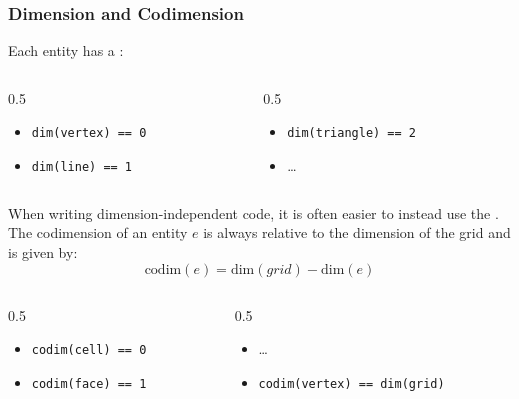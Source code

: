 \documentclass[aspectratio=169,11pt]{beamer}
\theoremstyle{definition}
\begin{document}
\begin{frame}[fragile]
  \frametitle{Dimension and Codimension}
  Each entity has a :
  \begin{columns}
    \begin{column}{0.5\textwidth}
      \begin{itemize}
      \item \lstinline!dim(vertex) == 0!
      \item \lstinline!dim(line) == 1!
      \end{itemize}
    \end{column}
    \begin{column}{0.5\textwidth}
      \begin{itemize}
      \item \lstinline!dim(triangle) == 2!
      \item \dots
      \end{itemize}
    \end{column}
    \end{columns}
  \pause\vspace*{2em}
  When writing dimension-independent code, it is often easier to instead use the .\\[1em]
  The codimension of an entity $e$ is always relative to the dimension of the grid and is given by:
  \begin{equation*}
    \mathrm{codim}(e) = \mathrm{dim}(grid) - \mathrm{dim}(e)
  \end{equation*}
  \begin{columns}
    \begin{column}{0.5\textwidth}
      \begin{itemize}
      \item \lstinline!codim(cell) == 0!
      \item \lstinline!codim(face) == 1!
      \end{itemize}
    \end{column}
    \begin{column}{0.5\textwidth}
      \begin{itemize}
      \item \dots
      \item \lstinline!codim(vertex) == dim(grid)!
      \end{itemize}
    \end{column}
    \end{columns}

\end{frame}
\end{document}

